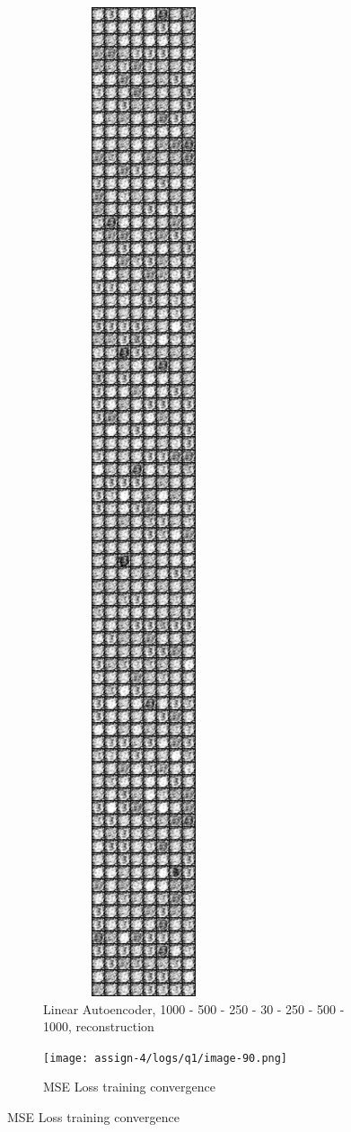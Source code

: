 \begin{figure}[!htbp]
          \begin{subfigure}
          \centering
          \includegraphics[angle=0,width=0.65\textwidth]{assign-4/logs/q1/linear_autoencoder/image_90.png}
          \caption{Linear Autoencoder, 1000 - 500 - 250 - 30 - 250 - 500 - 1000, reconstruction}
          \end{subfigure}
          \begin{subfigure}
          \centering
          \texttt{[image: assign-4/logs/q1/image-90.png]}
          \caption{MSE Loss training convergence}
          \end{subfigure}
          \end{figure}
          

